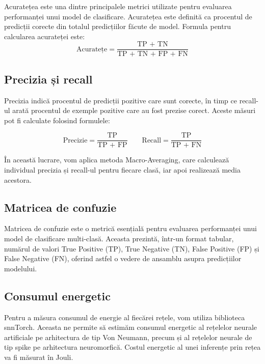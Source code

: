 Acuratețea este una dintre principalele metrici utilizate pentru evaluarea performanței unui model de clasificare. Acuratețea este definită ca procentul de predicții corecte din totalul predicțiilor făcute de model. Formula pentru calcularea acurateței este:
\[
\text{Acuratețe} = \frac{\text{TP + TN}}{\text{TP + TN + FP + FN}}
\]


\subsection{Precizia și recall}

Precizia indică procentul de predicții pozitive care sunt corecte, în timp ce recall-ul arată procentul de exemple pozitive care au fost prezise corect. Aceste măsuri pot fi calculate folosind formulele:

\[
\text{Precizie} = \frac{\text{TP}}{\text{TP + FP}} \quad \quad \text{Recall} = \frac{\text{TP}}{\text{TP + FN}}
\]

În această lucrare, vom aplica metoda Macro-Averaging, care calculează individual precizia și recall-ul pentru fiecare clasă, iar apoi realizează media acestora.

\subsection{Matricea de confuzie}

Matricea de confuzie este o metrică esențială pentru evaluarea performanței unui model de clasificare multi-clasă. Aceasta prezintă, într-un format tabular, numărul de valori True Positive (TP), True Negative (TN), False Positive (FP) și False Negative (FN), oferind astfel o vedere de ansamblu asupra predicțiilor modelului.


\subsection{Consumul energetic}

Pentru a măsura consumul de energie al fiecărei rețele, vom utiliza biblioteca snnTorch. Aceasta ne permite să estimăm consumul energetic al rețelelor neurale artificiale pe arhitectura de tip Von Neumann, precum și al rețelelor neurale de tip spike pe arhitectura neuromorfică. Costul energetic al unei inferențe prin rețea va fi măsurat în Jouli.